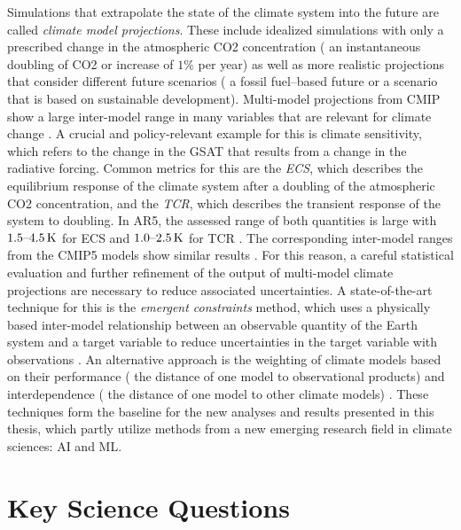 Simulations that extrapolate the state of the climate system into the future
are called \emph{climate model projections}. These include idealized
simulations with only a prescribed change in the atmospheric \ac{CO2}
concentration (\eg{} an instantaneous doubling of \ac{CO2} or 
increase of $1 \unit{\%}$ per year) as well as more realistic projections that
consider different future scenarios (\eg{} a fossil fuel--based future or a
scenario that is based on sustainable development). Multi-model projections
from \ac{CMIP} show a large inter-model range in many variables that are
relevant for climate change \autocite{Collins2013, Flato2013}. A crucial and
policy-relevant example for this is climate sensitivity, which refers to the
change in the \ac{GSAT} that results from a change in the radiative forcing.
Common metrics for this are the \emph{\ac{ECS}}, which describes the
equilibrium response of the climate system after a doubling of the atmospheric
\ac{CO2} concentration, and the \emph{\ac{TCR}}, which describes the transient
response of the system to  doubling. In \acs{AR}5, the assessed range
of both quantities is large with $\rangeunit{1.5}{4.5}{K}$ for \ac{ECS} and
$\rangeunit{1.0}{2.5}{K}$ for \ac{TCR} \autocite{Stocker2013}. The
corresponding inter-model ranges from the \acs{CMIP}5 models show similar
results \autocite{Flato2013}. For this reason, a careful statistical evaluation
and further refinement of the output of multi-model climate projections are
necessary to reduce associated uncertainties. A state-of-the-art technique for
this is the \emph{emergent constraints} method, which uses a physically based
inter-model relationship between an observable quantity of the Earth system and
a target variable to reduce uncertainties in the target variable with
observations \autocite{Allen2002}. An alternative approach is the weighting of
climate models based on their performance (\ie{} the distance of one model to
observational products) and interdependence (\ie{} the distance of one model to
other climate models) \autocite{Knutti2017a}. These techniques form the
baseline for the new analyses and results presented in this thesis, which
partly utilize methods from a new emerging research field in climate sciences:
\ac{AI} and \ac{ML}.


\section{Key Science Questions}
\label{sec:01:key_science_questions}

